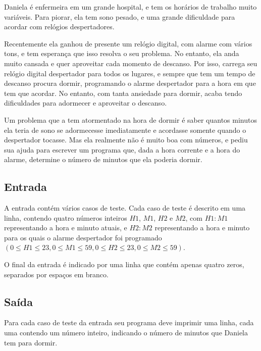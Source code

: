 Daniela é enfermeira em um grande hospital, e tem os horários de trabalho muito
variáveis. Para piorar, ela tem sono pesado, e uma grande dificuldade para
acordar com relógios despertadores.

Recentemente ela ganhou de presente um relógio digital, com alarme com vários
tons, e tem esperança que isso resolva o seu problema. No entanto, ela anda
muito cansada e quer aproveitar cada momento de descanso. Por isso, carrega seu
relógio digital despertador para todos os lugares, e sempre que tem um tempo de
descanso procura dormir, programando o alarme despertador para a hora em que tem
que acordar. No entanto, com tanta ansiedade para dormir, acaba tendo
dificuldades para adormecer e aproveitar o descanso.

Um problema que a tem atormentado na hora de dormir é saber quantos minutos ela
teria de sono se adormecesse imediatamente e acordasse somente quando o
despertador tocasse. Mas ela realmente não é muito boa com números, e pediu sua
ajuda para escrever um programa que, dada a hora corrente e a hora do alarme,
determine o número de minutos que ela poderia dormir.

\subsection*{Entrada}

A entrada contém vários casos de teste. Cada caso de teste é descrito em uma
linha, contendo quatro números inteiros $H1$, $M1$, $H2$ e $M2$, com $H1:M1$ representando
a hora e minuto atuais, e $H2:M2$ representando a hora e minuto para os quais o
alarme despertador foi programado
$(0 \leq H1 \leq 23, 0 \leq M1 \leq 59, 0 \leq H2 \leq 23, 0 \leq M2 \leq 59)$.

O final da entrada é indicado por uma linha que contém apenas quatro zeros,
separados por espaços em branco.

\subsection*{Saída}

Para cada caso de teste da entrada seu programa deve imprimir uma linha, cada
uma contendo um número inteiro, indicando o número de minutos que Daniela tem
para dormir.

